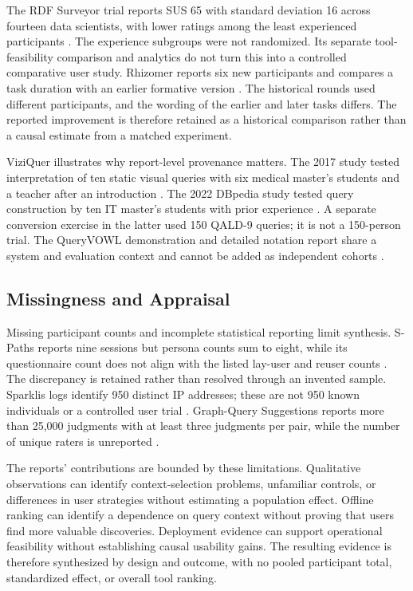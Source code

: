 \documentclass[manuscript,review,screen]{acmart}
\begin{document}
The RDF Surveyor trial reports SUS 65 with standard deviation 16 across fourteen data scientists, with lower ratings among the least experienced participants \citep{V3-01765}. The experience subgroups were not randomized. Its separate tool-feasibility comparison and analytics do not turn this into a controlled comparative user study. Rhizomer reports six new participants and compares a task duration with an earlier formative version \citep{V3-01105}. The historical rounds used different participants, and the wording of the earlier and later tasks differs. The reported improvement is therefore retained as a historical comparison rather than a causal estimate from a matched experiment.

ViziQuer illustrates why report-level provenance matters. The 2017 study tested interpretation of ten static visual queries with six medical master's students and a teacher after an introduction \citep{V3-01077}. The 2022 DBpedia study tested query construction by ten IT master's students with prior experience \citep{V3-01013}. A separate conversion exercise in the latter used 150 QALD-9 queries; it is not a 150-person trial. The QueryVOWL demonstration and detailed notation report share a system and evaluation context and cannot be added as independent cohorts \citep{V3-02190,V3-02191}.

\subsection{Missingness and Appraisal}
Missing participant counts and incomplete statistical reporting limit synthesis. S-Paths reports nine sessions but persona counts sum to eight, while its questionnaire count does not align with the listed lay-user and reuser counts \citep{2021_Destandau_S-Paths_Set-based}. The discrepancy is retained rather than resolved through an invented sample. Sparklis logs identify 950 distinct IP addresses; these are not 950 known individuals or a controlled user trial \citep{2017_Ferre_Sparklis_An}. Graph-Query Suggestions reports more than 25,000 judgments with at least three judgments per pair, while the number of unique raters is unreported \citep{2020_Lissandrini_Graph-Query_Suggestions}.

The reports' contributions are bounded by these limitations. Qualitative observations can identify context-selection problems, unfamiliar controls, or differences in user strategies without estimating a population effect. Offline ranking can identify a dependence on query context without proving that users find more valuable discoveries. Deployment evidence can support operational feasibility without establishing causal usability gains. The resulting evidence is therefore synthesized by design and outcome, with no pooled participant total, standardized effect, or overall tool ranking.
\end{document}
